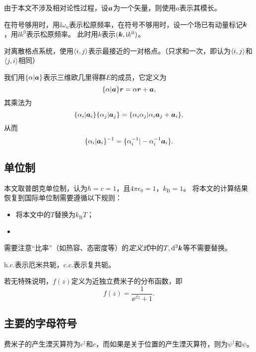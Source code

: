 由于本文不涉及相对论性过程，设$\vb*{a}$为一个矢量，则使用$a$表示其模长。

在符号够用时，用$\ii \omega_n$表示松原频率，在符号不够用时，设一个场已有动量标记$\vb*{k}$，用$\ii k^0$表示松原频率。
此时用$k$表示$(\vb*{k}, \mathrm{i} k^0)$。

对离散格点系统，使用$\langle i, j \rangle$表示最接近的一对格点。（只求和一次，即认为$\langle i, j \rangle$和$\langle j, i \rangle$相同）

我们用$\{\alpha | \vb*{a} \}$表示三维欧几里得群$E$的成员，它定义为
\begin{equation}
    \{\alpha | \vb*{a} \} \vb*{r} = \alpha \vb*{r} + \vb*{a},
\end{equation}
其乘法为
\begin{equation}
    \{\alpha_i | \vb*{a}_i \} \{\alpha_j | \vb*{a}_j \} = \{ \alpha_i \alpha_j | \alpha_i \vb*{a}_j + \vb*{a}_i \},
\end{equation}
从而
\begin{equation}
    \{\alpha_i | \vb*{a}_i \}^{-1} = \{ \alpha_i^{-1} | - \alpha_i^{-1} \vb*{a}_i \}.
\end{equation}

\subsection*{单位制}

本文取普朗克单位制，认为$\hbar=c=1$，且$4\pi\epsilon_0=1$，$k_\text{B}=1$。
将本文的计算结果恢复到国际单位制需要遵循以下规则：
\begin{itemize}
    \item 将本文中的$T$替换为$k_\text{B} T$；
    \item 
\end{itemize}
需要注意“比率”（如热容、态密度等）的\emph{定义式}中的$T, \dd[3]{\vb*{k}}$等不需要替换。

$\text{h.c.}$表示厄米共轭，$\text{c.c.}$表示复共轭。

若无特殊说明，$f(z)$定义为近独立费米子的分布函数，即
\[
    f(z) = \frac{1}{\ee^{\beta z} + 1}.
\]

\subsection*{主要的字母符号}

费米子的产生湮灭算符为${c}^\dagger$和${c}$，而如果是关于位置的产生湮灭算符，则为${\psi}^\dagger$和${\psi}$。
